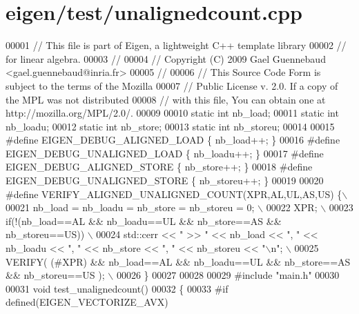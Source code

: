 \hypertarget{eigen_2test_2unalignedcount_8cpp_source}{}\section{eigen/test/unalignedcount.cpp}
\label{eigen_2test_2unalignedcount_8cpp_source}

\begin{DoxyCode}
00001 \textcolor{comment}{// This file is part of Eigen, a lightweight C++ template library}
00002 \textcolor{comment}{// for linear algebra.}
00003 \textcolor{comment}{//}
00004 \textcolor{comment}{// Copyright (C) 2009 Gael Guennebaud <gael.guennebaud@inria.fr>}
00005 \textcolor{comment}{//}
00006 \textcolor{comment}{// This Source Code Form is subject to the terms of the Mozilla}
00007 \textcolor{comment}{// Public License v. 2.0. If a copy of the MPL was not distributed}
00008 \textcolor{comment}{// with this file, You can obtain one at http://mozilla.org/MPL/2.0/.}
00009 
00010 \textcolor{keyword}{static} \textcolor{keywordtype}{int} nb\_load;
00011 \textcolor{keyword}{static} \textcolor{keywordtype}{int} nb\_loadu;
00012 \textcolor{keyword}{static} \textcolor{keywordtype}{int} nb\_store;
00013 \textcolor{keyword}{static} \textcolor{keywordtype}{int} nb\_storeu;
00014 
00015 \textcolor{preprocessor}{#define EIGEN\_DEBUG\_ALIGNED\_LOAD    \{ nb\_load++;    \}}
00016 \textcolor{preprocessor}{#define EIGEN\_DEBUG\_UNALIGNED\_LOAD  \{ nb\_loadu++;   \}}
00017 \textcolor{preprocessor}{#define EIGEN\_DEBUG\_ALIGNED\_STORE   \{ nb\_store++;   \}}
00018 \textcolor{preprocessor}{#define EIGEN\_DEBUG\_UNALIGNED\_STORE \{ nb\_storeu++;  \}}
00019 
00020 \textcolor{preprocessor}{#define VERIFY\_ALIGNED\_UNALIGNED\_COUNT(XPR,AL,UL,AS,US) \{\(\backslash\)}
00021 \textcolor{preprocessor}{    nb\_load = nb\_loadu = nb\_store = nb\_storeu = 0; \(\backslash\)}
00022 \textcolor{preprocessor}{    XPR; \(\backslash\)}
00023 \textcolor{preprocessor}{    if(!(nb\_load==AL && nb\_loadu==UL && nb\_store==AS && nb\_storeu==US)) \(\backslash\)}
00024 \textcolor{preprocessor}{      std::cerr << " >> " << nb\_load << ", " << nb\_loadu << ", " << nb\_store << ", " << nb\_storeu << "\(\backslash\)n"; 
      \(\backslash\)}
00025 \textcolor{preprocessor}{    VERIFY( (#XPR) && nb\_load==AL && nb\_loadu==UL && nb\_store==AS && nb\_storeu==US ); \(\backslash\)}
00026 \textcolor{preprocessor}{  \}}
00027 
00028 
00029 \textcolor{preprocessor}{#include "main.h"}
00030 
00031 \textcolor{keywordtype}{void} test\_unalignedcount()
00032 \{
00033 \textcolor{preprocessor}{  #if defined(EIGEN\_VECTORIZE\_AVX)}

\end{DoxyCode}
